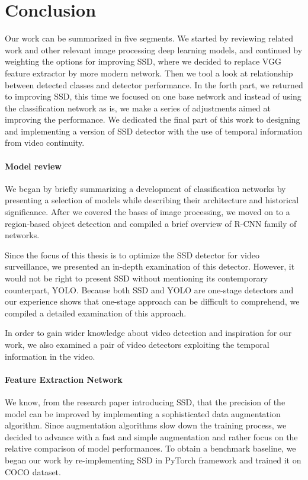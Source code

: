 \chapter*{Conclusion}

Our work can be summarized in five segments. We started by reviewing related work and other relevant image processing deep learning models, and continued by weighting the options for improving SSD, where we decided to replace VGG feature extractor by more modern network. Then we tool a look at relationship between detected classes and detector performance. In the forth part, we returned to improving SSD, this time we focused on one base network and instead of using the classification network as is, we make a series of adjustments aimed at improving the performance. We dedicated the final part of this work to designing and implementing a version of SSD detector with the use of temporal information from video continuity.

\subsubsection*{Model review}
We began by briefly summarizing a development of classification networks by presenting a selection of models while describing their architecture and historical significance. After we covered the bases of image processing, we moved on to a region-based object detection and compiled a brief overview of R-CNN family of networks.

Since the focus of this thesis is to optimize the SSD detector for video surveillance, we presented an in-depth examination of this detector. However, it would not be right to present SSD without mentioning its contemporary counterpart, YOLO. Because both SSD and YOLO are one-stage detectors and our experience shows that one-stage approach can be difficult to comprehend, we compiled a detailed examination of this approach.

In order to gain wider knowledge about video detection and inspiration for our work, we also examined a pair of video detectors exploiting the temporal information in the video.

\subsubsection*{Feature Extraction Network}
We know, from the research paper introducing SSD, that the precision of the model can be improved by implementing a sophisticated data augmentation algorithm. Since augmentation algorithms slow down the training process, we decided to advance with a fast and simple augmentation and rather focus on the relative comparison of model performances. To obtain a benchmark baseline, we began our work by re-implementing SSD in PyTorch framework and trained it on COCO dataset.

